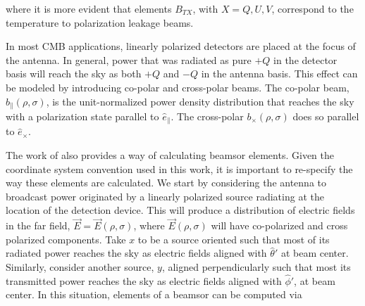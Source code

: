 \documentclass[a4paper,fleqn]{cas-dc}\sloppy
\newcommand{\co}{\mathbin{\|}}
\newcommand{\cx}{\mathbin{\times}}
\begin{document}
	\noindent
	where it is more evident that elements $B_{TX}$, with $X=Q,U,V$, correspond to the temperature to polarization leakage beams. 
	
	In most CMB applications, linearly polarized detectors are placed at the focus of the antenna. In general, power that was radiated as pure $+Q$ in the detector basis will reach the sky as both $+Q$ and $-Q$ in the antenna basis. This effect can be modeled by introducing co-polar and cross-polar beams. The co-polar beam, $b_{\co}(\rho,\sigma)$, is the unit-normalized power density distribution that reaches the sky with a polarization state parallel to $\hat{e}_{\co}$. The cross-polar $b_{\cx}(\rho,\sigma)$ does so parallel to $\hat{e}_{\cx}$. 
	
	The work of \cite{2007A&A...470..771J} also provides a way of calculating beamsor elements. Given the coordinate system convention used in this work, it is important to re-specify the way these elements are calculated. We start by considering the antenna to broadcast power originated by a linearly polarized source radiating at the location of the detection device. This will produce a distribution of electric fields in the far field, $\vec{E} = \vec{E}(\rho,\sigma)$, where $\vec{E}(\rho,\sigma)$ will have co-polarized and cross polarized components. Take $x$ to be a source oriented such that most of its radiated power reaches the sky as electric fields aligned with $\hat{\theta}'$ at beam center. Similarly, consider another source, $y$, aligned perpendicularly such that most its transmitted power reaches the sky as electric fields aligned with $\hat{\phi}'$, at beam center. In this situation, elements of a beamsor can be computed via
	
\end{document}
